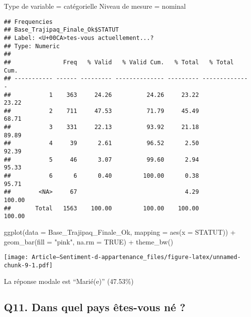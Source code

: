 \documentclass[
]{article}
\newenvironment{Shaded}{\begin{snugshade}}{\end{snugshade}}
\newcommand{\AttributeTok}[1]{\textcolor[rgb]{0.77,0.63,0.00}{#1}}
\newcommand{\ConstantTok}[1]{\textcolor[rgb]{0.00,0.00,0.00}{#1}}
\newcommand{\FunctionTok}[1]{\textcolor[rgb]{0.00,0.00,0.00}{#1}}
\newcommand{\NormalTok}[1]{#1}
\newcommand{\SpecialCharTok}[1]{\textcolor[rgb]{0.00,0.00,0.00}{#1}}
\newcommand{\StringTok}[1]{\textcolor[rgb]{0.31,0.60,0.02}{#1}}
\begin{document}
Type de variable = catégorielle Niveau de mesure = nominal

\begin{Shaded}
\end{Shaded}

\begin{verbatim}
## Frequencies  
## Base_Trajipaq_Finale_Ok$STATUT  
## Label: <U+00CA>tes-vous actuellement...?  
## Type: Numeric  
## 
##               Freq   % Valid   % Valid Cum.   % Total   % Total Cum.
## ----------- ------ --------- -------------- --------- --------------
##           1    363     24.26          24.26     23.22          23.22
##           2    711     47.53          71.79     45.49          68.71
##           3    331     22.13          93.92     21.18          89.89
##           4     39      2.61          96.52      2.50          92.39
##           5     46      3.07          99.60      2.94          95.33
##           6      6      0.40         100.00      0.38          95.71
##        <NA>     67                               4.29         100.00
##       Total   1563    100.00         100.00    100.00         100.00
\end{verbatim}

\begin{Shaded}
\begin{Highlighting}[]
\FunctionTok{ggplot}\NormalTok{(}\AttributeTok{data =}\NormalTok{ Base\_Trajipaq\_Finale\_Ok, }\AttributeTok{mapping =} \FunctionTok{aes}\NormalTok{(}\AttributeTok{x =}\NormalTok{ STATUT)) }\SpecialCharTok{+}
  \FunctionTok{geom\_bar}\NormalTok{(}\AttributeTok{fill =} \StringTok{"pink"}\NormalTok{, }\AttributeTok{na.rm =} \ConstantTok{TRUE}\NormalTok{) }\SpecialCharTok{+}
  \FunctionTok{theme\_bw}\NormalTok{()}
\end{Highlighting}
\end{Shaded}

\texttt{[image: Article---Sentiment-d-appartenance\_files/figure-latex/unnamed-chunk-9-1.pdf]}

La réponse modale est ``Marié(e)'' (47.53\%)

\hypertarget{q11.-dans-quel-pays-uxeates-vous-nuxe9}{%
\subsection{Q11. Dans quel pays êtes-vous né
?}\label{q11.-dans-quel-pays-uxeates-vous-nuxe9}}
\end{document}
